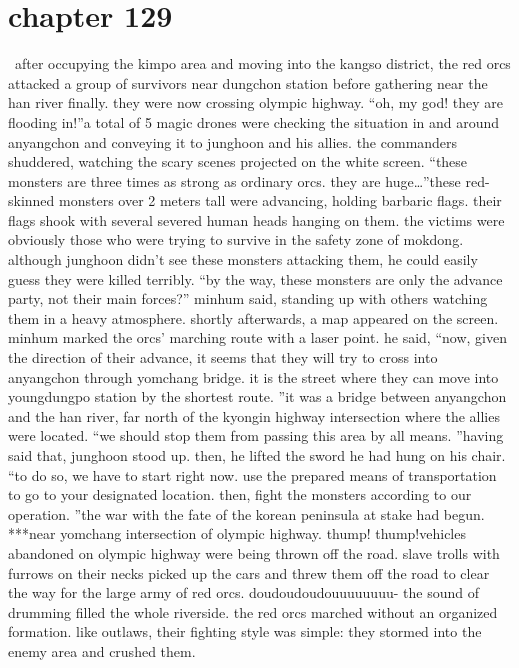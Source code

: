\section{chapter 129}






 after occupying the kimpo area and moving into the kangso district, the red orcs attacked a group of survivors near dungchon station before gathering near the han river finally.
 they were now crossing olympic highway.
“oh, my god! they are flooding in!”a total of 5 magic drones were checking the situation in and around anyangchon and conveying it to junghoon and his allies.
 the commanders shuddered, watching the scary scenes projected on the white screen.
“these monsters are three times as strong as ordinary orcs.
 they are huge…”these red-skinned monsters over 2 meters tall were advancing, holding barbaric flags.
their flags shook with several severed human heads hanging on them.
the victims were obviously those who were trying to survive in the safety zone of mokdong.
although junghoon didn’t see these monsters attacking them, he could easily guess they were killed terribly.
“by the way, these monsters are only the advance party, not their main forces?” minhum said, standing up with others watching them in a heavy atmosphere.
 shortly afterwards, a map appeared on the screen.
 minhum marked the orcs’ marching route with a laser point.
he said, “now, given the direction of their advance, it seems that they will try to cross into anyangchon through yomchang bridge.
 it is the street where they can move into youngdungpo station by the shortest route.
”it was a bridge between anyangchon and the han river, far north of the kyongin highway intersection where the allies were located.
“we should stop them from passing this area by all means.
”having said that, junghoon stood up.
 then, he lifted the sword he had hung on his chair.
 “to do so, we have to start right now.
 use the prepared means of transportation to go to your designated location.
 then, fight the monsters according to our operation.
”the war with the fate of the korean peninsula at stake had begun.
***near yomchang intersection of olympic highway.
thump! thump!vehicles abandoned on olympic highway were being thrown off the road.
 slave trolls with furrows on their necks picked up the cars and threw them off the road to clear the way for the large army of red orcs.
doudoudoudouuuuuuuu-
the sound of drumming filled the whole riverside.
 the red orcs marched without an organized formation.
 like outlaws, their fighting style was simple: they stormed into the enemy area and crushed them.
